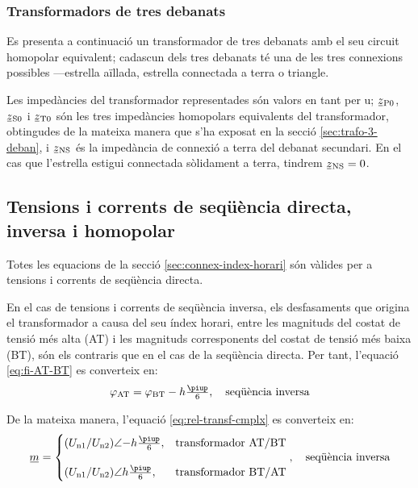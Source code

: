 \subsubsection{Transformadors de tres debanats}\label{sec:cir-hom-3-deb}

Es presenta a continuació un transformador de tres debanats amb el seu circuit homopolar equivalent; cadascun dels tres debanats té una de les tres connexions possibles ---estrella aïllada, estrella connectada a terra o triangle.

Les impedàncies del transformador representades són valors en tant per u; $\cmplx{z}\ped{P0}$, $\cmplx{z}\ped{S0}$ i $\cmplx{z}\ped{T0}$ són les tres impedàncies homopolars equivalents del transformador, obtingudes de la mateixa manera que s'ha exposat en la secció \ref{sec:trafo-3-deban}, i $\cmplx{z}\ped{NS}$ és  la impedància de connexió a terra del debanat secundari. En el cas que l'estrella estigui connectada sòlidament a terra, tindrem $\cmplx{z}\ped{NS}=0$.

\begin{center}
    
\end{center}


\subsection{Tensions i corrents de seqüència directa, inversa i homopolar}


Totes les equacions de la secció \ref{sec:connex-index-horari} són vàlides per a tensions i corrents de seqüència directa.

En el cas de tensions i corrents de seqüència inversa, els desfasaments que origina el transformador a causa del seu índex horari, entre les magnituds  del costat de tensió més alta (AT) i les magnituds corresponents del costat de tensió més baixa (BT), són els contraris que en el cas de la seqüència directa. Per tant, l'equació  \eqref{eq:fi-AT-BT} es converteix en:
\begin{equation}
    \varphi\ped{AT} = \varphi\ped{BT} - h\tfrac{\piup}{6}, \quad\text{seqüència inversa}
\end{equation}

De la mateixa manera, l'equació \eqref{eq:rel-transf-cmplx} es converteix en:
\begin{equation}\label{eq:rel-transf-cmplx-inv}
\cmplx{m} = \begin{cases}
     (U\ped{n1}/U\ped{n2})\angle{-h} \frac{\piup}{6}, & \text{transformador AT/BT}\\[2.7ex]
     (U\ped{n1}/U\ped{n2})\angle h \frac{\piup}{6}, & \text{transformador BT/AT}
\end{cases},
\quad\text{seqüència inversa}
\end{equation}

